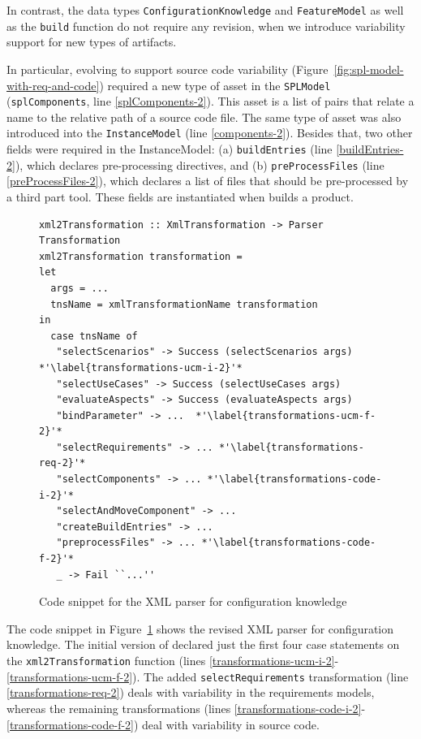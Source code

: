 In contrast, the data types \texttt{ConfigurationKnowledge} and
\texttt{FeatureModel} as well as the \texttt{build} function do not
require any revision, when we introduce variability support for new
types of artifacts.

In particular, evolving \hp{} to support source code variability
(Figure~\ref{fig:spl-model-with-req-and-code}) required a new type of
asset in the \texttt{SPLModel} (\texttt{splComponents}, line
\ref{splComponents-2}). This asset is a list of pairs that relate a
name to the relative path of a source code file. The same type of
asset was also introduced into the \texttt{InstanceModel} (line
\ref{components-2}). Besides that, two other fields were required in
the InstanceModel: (a) \texttt{buildEntries} (line
\ref{buildEntries-2}), which declares pre-processing directives, and
(b) \texttt{preProcessFiles} (line \ref{preProcessFiles-2}), which
declares a list of files that should be pre-processed by a third part
tool. These fields are instantiated when \hp{} builds a product.


\begin{figure}[t!]
\begin{lstlisting}
xml2Transformation :: XmlTransformation -> Parser Transformation
xml2Transformation transformation =
let
  args = ...
  tnsName = xmlTransformationName transformation
in
  case tnsName of
   "selectScenarios" -> Success (selectScenarios args) *'\label{transformations-ucm-i-2}'*
   "selectUseCases" -> Success (selectUseCases args)
   "evaluateAspects" -> Success (evaluateAspects args)
   "bindParameter" -> ...  *'\label{transformations-ucm-f-2}'*
   "selectRequirements" -> ... *'\label{transformations-req-2}'*
   "selectComponents" -> ... *'\label{transformations-code-i-2}'*
   "selectAndMoveComponent" -> ...
   "createBuildEntries" -> ...
   "preprocessFiles" -> ... *'\label{transformations-code-f-2}'*
   _ -> Fail ``...''
\end{lstlisting}
\caption{Code snippet for the XML parser for configuration knowledge}
\label{fig:xml-transformation-parser}
\end{figure}


The code snippet in Figure~\ref{fig:xml-transformation-parser} shows
the revised XML parser for configuration knowledge. The initial
version of \hp{} declared just the first four case statements on the
\texttt{xml2Transformation} function (lines
\ref{transformations-ucm-i-2}-\ref{transformations-ucm-f-2}). The
added \texttt{selectRequirements} transformation (line
\ref{transformations-req-2}) deals with variability in the
requirements models, whereas the remaining transformations (lines
\ref{transformations-code-i-2}-\ref{transformations-code-f-2}) deal
with variability in source code. 

